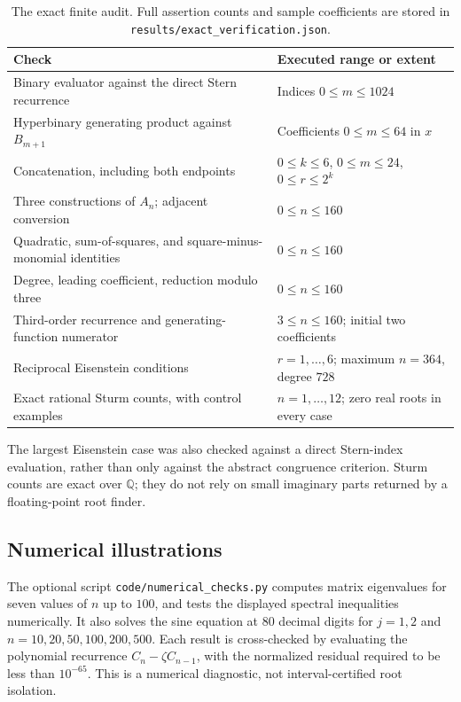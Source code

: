 \documentclass[11pt]{article}
\numberwithin{equation}{section}
\theoremstyle{definition}
\newcommand{\Q}{\mathbb Q}
\begin{document}
\begin{table}[htb]
\centering\small
\begin{tabular}{@{}>{\raggedright\arraybackslash}p{}>{\raggedright\arraybackslash}p{}@{}}
\toprule
Check & Executed range or extent\\
\midrule
Binary evaluator against the direct Stern recurrence & Indices $0\leq m\leq1024$\\
Hyperbinary generating product against $B_{m+1}$ & Coefficients $0\leq m\leq64$ in $x$\\
Concatenation, including both endpoints & $0\leq k\leq6$, $0\leq m\leq24$, $0\leq r\leq2^k$\\
Three constructions of $A_n$; adjacent conversion & $0\leq n\leq160$\\
Quadratic, sum-of-squares, and square-minus-monomial identities & $0\leq n\leq160$\\
Degree, leading coefficient, reduction modulo three & $0\leq n\leq160$\\
Third-order recurrence and generating-function numerator & $3\leq n\leq160$; initial two coefficients\\
Reciprocal Eisenstein conditions & $r=1,\ldots,6$; maximum $n=364$, degree $728$\\
Exact rational Sturm counts, with control examples & $n=1,\ldots,12$; zero real roots in every case\\
\bottomrule
\end{tabular}
\caption{The exact finite audit.  Full assertion counts and sample
coefficients are stored in \texttt{results/exact\_verification.json}.}
\label{tab:checks}
\end{table}

The largest Eisenstein case was also checked against a direct Stern-index
evaluation, rather than only against the abstract congruence criterion.
Sturm counts are exact over $\Q$; they do not rely on small imaginary
parts returned by a floating-point root finder.

\subsection{Numerical illustrations}

The optional script \texttt{code/numerical\_checks.py} computes matrix
eigenvalues for seven values of $n$ up to $100$, and tests the displayed
spectral inequalities numerically.  It also solves the sine equation at
80 decimal digits for $j=1,2$ and $n=10,20,50,100,200,500$.
Each result is cross-checked by evaluating the polynomial recurrence
$C_n-\zeta C_{n-1}$, with the normalized residual required to be less
than $10^{-65}$.  This is a numerical diagnostic, not interval-certified
root isolation.
\end{document}
